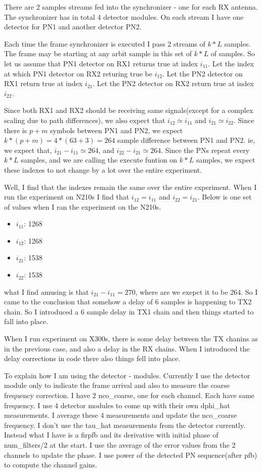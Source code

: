 \documentclass{article}
\begin{document}
There are 2 samples streams fed into the synchronizer - one for each RX
antenna. The synchronizer has in total 4 detector modules. On each
stream I have one detector for PN1 and another detector PN2.

Each time the frame synchronizer is executed I pass 2 streams of $k*L$
samples. The frame may be starting at any arbit sample in this set of $k*L$ of samples.
So let us assume that PN1 detector on RX1 returns true at index $i_{11}$.
Let the index at which PN1 detector on RX2 returing true be $i_{12}$.
Let the PN2 detector on RX1 return true at index $i_{21}$.
Let the PN2 detector on RX2 return true at index $i_{22}$.

Since both RX1 and RX2 should be receiving same signals(except for a complex
scaling due to path differences), we also expect that $i_{12} \simeq i_{11}$
and $i_{21} \simeq i_{22}$. Since there is $p + m$ symbols between PN1 and PN2,
we expect $k*(p + m) = 4*(63 + 3) = 264$ sample difference between PN1 and PN2.
ie, we expect that, $i_{21} - i_{11} \simeq 264$, and $i_{22} - i_{21} \simeq 264$.
Since the PNs repeat every $k*L$ samples, and we are calling the execute
funtion on $k*L$ samples, we expect these indexes to not change by a lot over
the entire experiment. 

Well, I find that the indexes remain the same over the entire experiment. When
I run the experiment on N210s I find that $i_{12} = i_{11}$ and $i_{22} =
i_{21}$. Below is one set of values when I ran the experiment on the N210s.
\begin{itemize}
  \item $i_{11}$:  1268
  \item $i_{12}$:  1268
  \item $i_{21}$:  1538
  \item $i_{22}$:  1538
\end{itemize}

what I find amusing is that $i_{21} - i_{11} = 270$, where are we exepct it to
be 264. So I came to the conclusion that somehow a delay of 6 samples is
happening to TX2 chain. So I introduced a 6 sample delay in TX1 chain and then
things started to fall into place.

When I run experiment on X300s, there is some delay between the TX chanins as
in the previous case, and also a delay in the RX chains. When I introduced the
delay corrections in code there also things fell into place.

To explain how I am using the detector - modules. Currently I use the detector
module only to indicate the frame arrival and also to measure the coarse
frequency correction. I have 2 nco\_coarse, one for each channel. Each have
same frequency. I use 4 detector modules to come up with their own dphi\_hat
measurements. I average these 4 measurements and update the nco\_coarse
frequency. I don't use the tau\_hat measurements from the detector currently.
Instead what I have is a firpfb and its derivative with initial phase of
num\_filters/2 at the start. I use the average of the error values from the 2
channels to update the phase. I use power of the detected PN sequence(after pfb)
to compute the channel gains.
\end{document}
